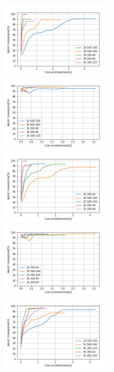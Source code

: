 \documentclass{article}
\begin{document}
\begin{figure}[H]
\includegraphics[width=0.5\textwidth]{Czasneg-los1.png}
\includegraphics[width=0.5\textwidth]{Czasneg-los-greedy1.png}
\includegraphics[width=0.5\textwidth]{Czasneg-los2.png}
\includegraphics[width=0.5\textwidth]{Czasneg-los-greedy2.png}
\includegraphics[width=0.5\textwidth]{Czasneg-los3.png}

\end{figure}
\end{document}
